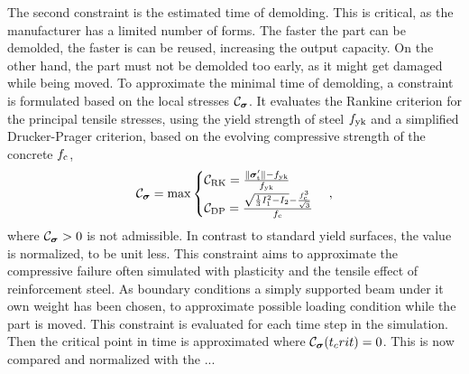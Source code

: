 The second constraint is the estimated time of demolding.
This is critical, as the manufacturer has a limited number of forms.
The faster the part can be demolded, the faster is can be reused, increasing the output capacity.
On the other hand, the part must not be demolded too early, as it might get damaged while being moved.
To approximate the minimal time of demolding, a constraint is formulated based on the local stresses $\mathcal{C}_{\boldsymbol{\sigma}}$.
It evaluates the Rankine criterion for the principal tensile stresses, using the yield strength of steel $f_{\text{yk}}$ and a simplified Drucker-Prager criterion, based on the evolving compressive strength of the concrete $f_{\text{c}}$,
\begin{align}
	\mathcal{C}_{\boldsymbol{\sigma}} =  \max
	\begin{cases}
		\mathcal{C}_{\text{RK}} = \frac{\|\boldsymbol{\sigma}_{\text{t}}'\| - f_{\text{yk}}}{f_{\text{yk}}} \\
		\mathcal{C}_{\text{DP}} =  \frac{\sqrt{\frac{1}{3} I_{1}^2 - I_{2}} - \frac{f_{\text{c}}^3}{\sqrt{3}}}{f_{\text{c}}}
	\end{cases},\label{eq:constraintStress}
\end{align}
where $\mathcal{C}_{\boldsymbol{\sigma}} > 0$ is not admissible.
In contrast to standard yield surfaces, the value is normalized, to be unit less.
This constraint aims to approximate the compressive failure often simulated with plasticity and the tensile effect of reinforcement steel.
As boundary conditions a simply supported beam under it own weight has been chosen, to approximate possible loading condition while the part is moved.
This constraint is evaluated for each time step in the simulation.
Then the critical point in time is approximated where $\mathcal{C}_{\boldsymbol{\sigma}}(t_crit) = 0$.
This is now compared and normalized with the ...
